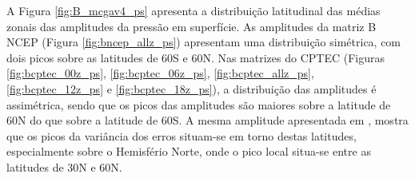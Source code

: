 \begin{figure}[H]
\begin{center}
  \end{center}
  \vspace{2mm}
  \legenda{}
  \label{fig:B_mcgav4_q}
\end{figure}

A Figura \ref{fig:B_mcgav4_ps} apresenta a distribuição latitudinal das médias zonais das amplitudes da pressão em superfície. As amplitudes da matriz B NCEP (Figura \ref{fig:bncep_allz_ps}) apresentam uma distribuição simétrica, com dois picos sobre as latitudes de 60S e 60N. Nas matrizes do CPTEC (Figuras \ref{fig:bcptec_00z_ps}, \ref{fig:bcptec_06z_ps}, \ref{fig:bcptec_allz_ps}, \ref{fig:bcptec_12z_ps} e \ref{fig:bcptec_18z_ps}), a distribuição das amplitudes é assimétrica, sendo que os picos das amplitudes são maiores sobre a latitude de 60N do que sobre a latitude de 60S. A mesma amplitude apresentada em , mostra que os picos da variância dos erros situam-se em torno destas latitudes, especialmente sobre o Hemisfério Norte, onde o pico local situa-se entre as latitudes de 30N e 60N.


